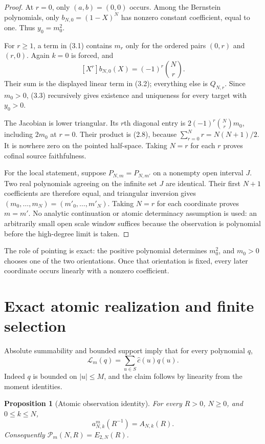 \documentclass[11pt]{article}
\newtheorem{proposition}[theorem]{Proposition}
\theoremstyle{remark}
\begin{document}
\begin{proof}
At $r=0$, only $(a,b)=(0,0)$ occurs.  Among the Bernstein polynomials, only
$b_{N,0}=(1-X)^N$ has nonzero constant coefficient, equal to one.  Thus $y_0=m_0^2$.

For $r\ge1$, a term in (3.1) contains $m_r$ only for the ordered pairs $(0,r)$ and $(r,0)$.
Again $k=0$ is forced, and
\[
 [X^r]b_{N,0}(X)=(-1)^r\binom Nr.
\]
Their sum is the displayed linear term in (3.2); everything else is $Q_{N,r}$.  Since $m_0>0$,
(3.3) recursively gives existence and uniqueness for every target with $y_0>0$.

The Jacobian is lower triangular.  Its $r$th diagonal entry is
$2(-1)^r\binom Nr m_0$, including $2m_0$ at $r=0$.  Their product is (2.8), because
$\sum_{r=0}^Nr=N(N+1)/2$.  It is nowhere zero on the pointed half-space.  Taking $N=r$ for each
$r$ proves cofinal source faithfulness.

For the local statement, suppose $P_{N,m}=P_{N,m'}$ on a nonempty open interval $J$.  Two real
polynomials agreeing on the infinite set $J$ are identical.  Their first $N+1$ coefficients are
therefore equal, and triangular inversion gives
$(m_0,\ldots,m_N)=(m'_0,\ldots,m'_N)$.  Taking $N=r$ for each coordinate proves $m=m'$.  No
analytic continuation or atomic determinacy assumption is used: an arbitrarily small open scale
window suffices because the observation is polynomial before the high-degree limit is taken.
\end{proof}

The role of pointing is exact: the positive polynomial determines $m_0^2$, and $m_0>0$ chooses
one of the two orientations.  Once that orientation is fixed, every later coordinate occurs
linearly with a nonzero coefficient.

\section{Exact atomic realization and finite selection}
\label{sec:selection}

Absolute summability and bounded support imply that for every polynomial $q$,
\begin{equation}
 \mathcal L_m(q)=\sum_{u\in S}\widehat c(u)q(u).
 \tag{4.1}
\end{equation}
Indeed $q$ is bounded on $|u|\le M$, and the claim follows by linearity from the moment identities.

\begin{proposition}[Atomic observation identity]
\label{prop:atomic}
For every $R>0$, $N\ge0$, and $0\le k\le N$,
\[
 a^m_{N,k}(R^{-1})=A_{N,k}(R).
\]
Consequently $\mathcal P_m(N,R)=E_{2,N}(R)$.
\end{proposition}
\end{document}
